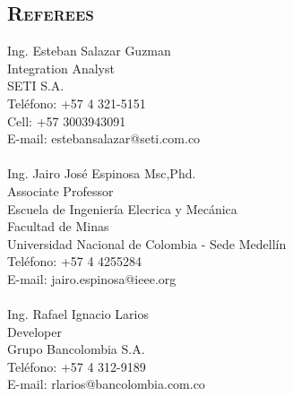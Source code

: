 \begin{resume}
\section{\textsc{Referees}}


 Ing. Esteban Salazar Guzman\\
 Integration Analyst \\
 SETI S.A. \\
 Tel\'{e}fono: +57 4 321-5151 \\
 Cell: +57 3003943091 \\ 
 E-mail: estebansalazar@seti.com.co\\
 \\  
 Ing. Jairo Jos\'{e} Espinosa Msc,Phd.\\
 Associate Professor \\
 Escuela de Ingenier\'{i}a Elecrica y Mec\'{a}nica \\
 Facultad de Minas \\
 Universidad Nacional de Colombia - Sede  Medell\'{i}n\\
 Tel\'{e}fono: +57 4 4255284 \\
 E-mail: jairo.espinosa@ieee.org\\
 \\  
 Ing. Rafael Ignacio Larios\\
 Developer \\
 Grupo Bancolombia S.A. \\
 Tel\'{e}fono: +57 4 312-9189  \\
 E-mail: rlarios@bancolombia.com.co \\



\end{resume}
